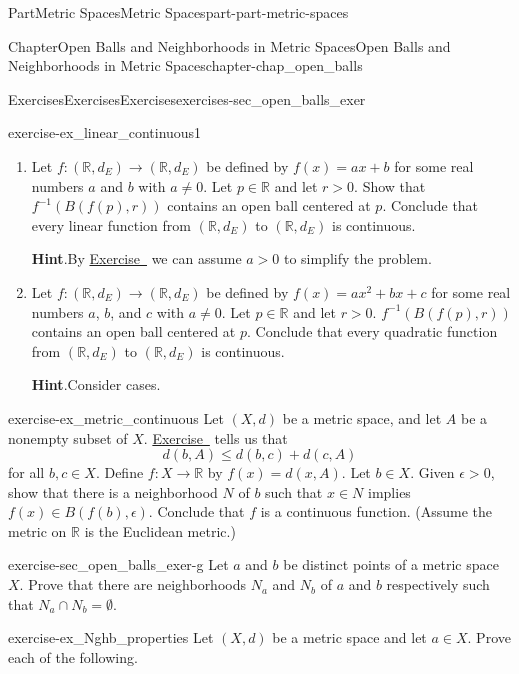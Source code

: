 \documentclass[oneside,10pt,]{book}
\newcommand{\blocktitlefont}{\relax}
\newcommand{\xreffont}{\relax}
\numberwithin{equation}{chapter}
\newcommand{\R}{\mathbb{R}}
\newcommand{\gt}{>}
\begin{document}
\begin{partptx}{Part}{Metric Spaces}{}{Metric Spaces}{}{}{part-part-metric-spaces}
\begin{chapterptx}{Chapter}{Open Balls and Neighborhoods in Metric Spaces}{}{Open Balls and Neighborhoods in Metric Spaces}{}{}{chapter-chap_open_balls}
\begin{exercises-section}{Exercises}{Exercises}{}{Exercises}{}{}{exercises-sec_open_balls_exer}
\begin{divisionexercise}{5}{}{}{exercise-ex_linear_continuous1}
\begin{enumerate}[font=\bfseries,label=(\alph*),ref=\alph*]
\item{}Let \(f: (\R,d_E) \to (\R,d_E)\) be defined by \(f(x) = ax+b\) for some real numbers \(a\) and \(b\) with \(a \neq 0\). Let \(p \in \R\) and let \(r \gt 0\). Show that \(f^{-1}(B(f(p),r))\) contains an open ball centered at \(p\). Conclude that every linear function from \((\R,d_E)\) to \((\R,d_E)\) is continuous.%
\par\smallskip%
\noindent\textbf{\blocktitlefont Hint}.\hypertarget{hint-ex_linear_continuous1-a-b}{}\quad{}By \hyperlink{exercise-ex_sum_continuous}{Exercise~{\xreffont 5}} we can assume \(a \gt 0\) to simplify the problem.%
\item{}Let \(f: (\R,d_E) \to (\R,d_E)\) be defined by \(f(x) = ax^2+bx+c\) for some real numbers \(a\), \(b\), and \(c\) with \(a \neq 0\). Let \(p \in \R\) and let \(r \gt 0\). \(f^{-1}(B(f(p),r))\) contains an open ball centered at \(p\). Conclude that every quadratic function from \((\R,d_E)\) to \((\R,d_E)\) is continuous.%
\par\smallskip%
\noindent\textbf{\blocktitlefont Hint}.\hypertarget{hint-ex_linear_continuous1-b-b}{}\quad{}Consider cases.%
\end{enumerate}%
\end{divisionexercise}%
\begin{divisionexercise}{6}{}{}{exercise-ex_metric_continuous}%
Let \((X,d)\) be a metric space, and let \(A\) be a nonempty subset of \(X\). \hyperlink{exercise-ex_GLB_triangle}{Exercise~{\xreffont 11}} tells us that%
\begin{equation*}
d(b,A) \leq d(b,c) + d(c,A)
\end{equation*}
for all \(b, c \in X\). Define \(f: X \to \R\) by \(f(x) = d(x,A)\). Let \(b \in X\). Given \(\epsilon \gt 0\), show that there is a neighborhood \(N\) of \(b\) such that \(x \in N\) implies \(f(x) \in B(f(b),\epsilon)\). Conclude that \(f\) is a continuous function. (Assume the metric on \(\R\) is the Euclidean metric.)%
\end{divisionexercise}%
\begin{divisionexercise}{7}{}{}{exercise-sec_open_balls_exer-g}%
Let \(a\) and \(b\) be distinct points of a metric space \(X\). Prove that there are neighborhoods \(N_a\) and \(N_b\) of \(a\) and \(b\) respectively such that \(N_a \cap N_b = \emptyset\).%
\end{divisionexercise}%
\begin{divisionexercise}{8}{}{}{exercise-ex_Nghb_properties}%
Let \((X,d)\) be a metric space and let \(a \in X\). Prove each of the following.%

\end{divisionexercise}
\end{exercises-section}
\end{chapterptx}
\end{partptx}
\end{document}
